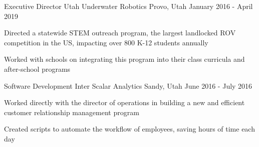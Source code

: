 \begin{cventries}
      \cventry
    {Executive Director}
    {Utah Underwater Robotics}
    {Provo, Utah}
    {January 2016 - April 2019}
    {
      \begin{cvitems}
        \item Directed a statewide STEM outreach program, the largest landlocked ROV competition in the US, impacting over 800 K-12 students annually
	  \item Worked with schools on integrating this program into their class curricula and after-school programs
      \end{cvitems}
    }

  \cventry
    {Software Development Inter}
    {Scalar Analytics}
    {Sandy, Utah}
    {June 2016 - July 2016}
    {
      \begin{cvitems}
      	\item Worked directly with the director of operations in building a new and efficient customer relationship management program
      	\item Created scripts to automate the workflow of employees, saving hours of time each day
      \end{cvitems}
    }
    


%
    

\end{cventries}

